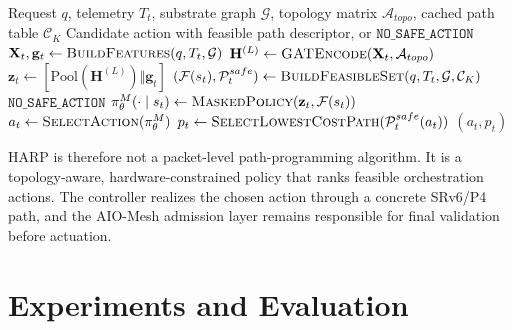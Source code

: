 \documentclass[final,5p]{elsarticle}
\begin{document}
\begin{algorithm}[t]
\caption{HARP decision procedure}
\label{alg:harp_decision}
\begin{algorithmic}[1]
\Require Request \(q\), telemetry \(T_t\), substrate graph \(\mathcal{G}\), topology matrix \(\mathcal{A}_{topo}\), cached path table \(\mathcal{C}_K\)
\Ensure Candidate action with feasible path descriptor, or \(\texttt{NO\_SAFE\_ACTION}\)
\State \(\mathbf{X}_t,\mathbf{g}_t \gets \textsc{BuildFeatures}(q,T_t,\mathcal{G})\)
\State \(\mathbf{H}^{(L)} \gets \textsc{GATEncode}(\mathbf{X}_t,\mathcal{A}_{topo})\)
\State \(\mathbf{z}_t \gets [\mathrm{Pool}(\mathbf{H}^{(L)})\Vert \mathbf{g}_t]\)
\State \((\mathcal{F}(s_t),\mathcal{P}^{safe}_t) \gets \textsc{BuildFeasibleSet}(q,T_t,\mathcal{G},\mathcal{C}_K)\)
    \State \Return \(\texttt{NO\_SAFE\_ACTION}\)
\EndIf
\State \(\pi_\theta^M(\cdot\mid s_t) \gets \textsc{MaskedPolicy}(\mathbf{z}_t,\mathcal{F}(s_t))\)
\State \(a_t \gets \textsc{SelectAction}(\pi_\theta^M)\)
\State \(p_t \gets \textsc{SelectLowestCostPath}(\mathcal{P}^{safe}_t(a_t))\)
\State \Return \((a_t,p_t)\)
\end{algorithmic}
\end{algorithm}

HARP is therefore not a packet-level path-programming algorithm. It is a topology-aware, hardware-constrained policy that ranks feasible orchestration actions. The controller realizes the chosen action through a concrete SRv6/P4 path, and the AIO-Mesh admission layer remains responsible for final validation before actuation.


\section{Experiments and Evaluation}
\label{sec:evaluation}
\end{document}

